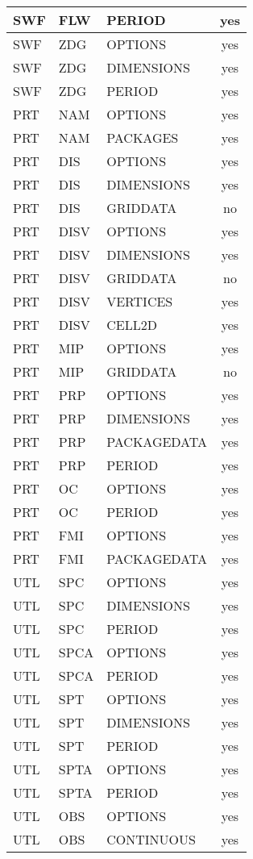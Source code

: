 \begin{longtable}{p{1.5cm} p{1.5cm} p{3cm} c}
SWF & FLW & PERIOD & yes \\ 
\hline
SWF & ZDG & OPTIONS & yes \\ 
SWF & ZDG & DIMENSIONS & yes \\ 
SWF & ZDG & PERIOD & yes \\ 
\hline
PRT & NAM & OPTIONS & yes \\ 
PRT & NAM & PACKAGES & yes \\ 
\hline
PRT & DIS & OPTIONS & yes \\ 
PRT & DIS & DIMENSIONS & yes \\ 
PRT & DIS & GRIDDATA & no \\ 
\hline
PRT & DISV & OPTIONS & yes \\ 
PRT & DISV & DIMENSIONS & yes \\ 
PRT & DISV & GRIDDATA & no \\ 
PRT & DISV & VERTICES & yes \\ 
PRT & DISV & CELL2D & yes \\ 
\hline
PRT & MIP & OPTIONS & yes \\ 
PRT & MIP & GRIDDATA & no \\ 
\hline
PRT & PRP & OPTIONS & yes \\ 
PRT & PRP & DIMENSIONS & yes \\ 
PRT & PRP & PACKAGEDATA & yes \\ 
PRT & PRP & PERIOD & yes \\ 
\hline
PRT & OC & OPTIONS & yes \\ 
PRT & OC & PERIOD & yes \\ 
\hline
PRT & FMI & OPTIONS & yes \\ 
PRT & FMI & PACKAGEDATA & yes \\ 
\hline
UTL & SPC & OPTIONS & yes \\ 
UTL & SPC & DIMENSIONS & yes \\ 
UTL & SPC & PERIOD & yes \\ 
\hline
UTL & SPCA & OPTIONS & yes \\ 
UTL & SPCA & PERIOD & yes \\ 
\hline
UTL & SPT & OPTIONS & yes \\ 
UTL & SPT & DIMENSIONS & yes \\ 
UTL & SPT & PERIOD & yes \\ 
\hline
UTL & SPTA & OPTIONS & yes \\ 
UTL & SPTA & PERIOD & yes \\ 
\hline
UTL & OBS & OPTIONS & yes \\ 
UTL & OBS & CONTINUOUS & yes \\ 

\end{longtable}
